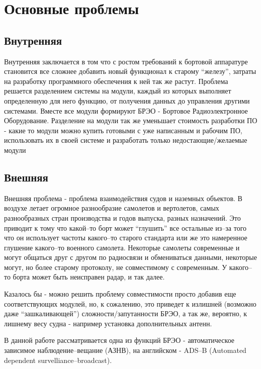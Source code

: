 \documentclass[a4paper,12pt]{report} %
\begin{document}
\section{Основные проблемы}

\subsection{Внутренняя}

Внутренняя заключается в том что с ростом требований к бортовой аппаратуре
становится все сложнее добавить новый функционал к старому ``железу'', затраты
на разработку программного обеспечения к ней так же растут. Проблема решается
разделением системы на модули, каждый из которых выполняет определенную для него
функцию, от получения данных до управления другими системами. Вместе все модули
формируют БРЭО - Бортовое Радиоэлектронное Оборудование. Разделение на модули
так же уменьшает стоимость разработки ПО - какие то модули можно купить готовыми
с уже написанным и рабочим ПО, использовать их в своей системе и разработать
только недостающие/желаемые модули

\subsection{Внешняя}

Внешняя проблема - проблема взаимодействия судов и наземных объектов. В воздухе
летает огромное разнообразие самолетов и вертолетов, самых разнообразных стран
производства и годов выпуска, разных назначений. Это приводит к тому что
какой--то борт может ``глушить'' все остальные из--за того что он использует
частоты какого--то старого стандарта или же это намеренное глушение какого--то
военного самолета. Некоторые самолеты современные и могут общаться друг с другом
по радиосвязи и обмениваться данными, некоторые могут, но более старому
протоколу, не совместимому с современным. У какого--то борта может быть
неисправен радар, и так далее.

Казалось бы - можно решить проблему совместимости просто добавив еще
соответствующих модулей, но, к сожалению, это приведет к излишней (возможно даже
``зашкаливающей'') сложности/запутанности БРЭО, а так же, вероятно, к лишнему
весу судна - например установка дополнительных антенн.

В данной работе рассматривается одна из функций БРЭО - автоматическое зависимое
наблюдение--вещание (АЗНВ), на английском - ADS--B (Automated dependent
survelliance--broadcast).
\end{document}
